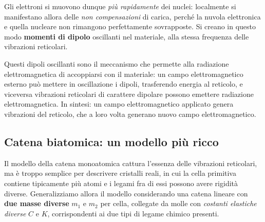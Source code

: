 Gli elettroni si muovono dunque \emph{più rapidamente} dei nuclei: localmente si manifestano allora delle \emph{non compensazioni} di carica, perché la nuvola elettronica e quella nucleare non rimangono perfettamente sovrapposte. Si creano in questo modo \textbf{momenti di dipolo} oscillanti nel materiale, alla stessa frequenza delle vibrazioni reticolari.

Questi dipoli oscillanti sono il meccanismo che permette alla radiazione elettromagnetica di accoppiarsi con il materiale: un campo elettromagnetico esterno può mettere in oscillazione i dipoli, trasferendo energia al reticolo, e viceversa vibrazioni reticolari di carattere dipolare possono emettere radiazione elettromagnetica. In sintesi: un campo elettromagnetico applicato genera vibrazioni del reticolo, che a loro volta generano nuovo campo elettromagnetico.

\subsection{Catena biatomica: un modello più ricco}

Il modello della catena monoatomica cattura l'essenza delle vibrazioni reticolari, ma è troppo semplice per descrivere cristalli reali, in cui la cella primitiva contiene tipicamente più atomi e i legami fra di essi possono avere rigidità diverse. Generalizziamo allora il modello considerando una catena lineare con \textbf{due masse diverse} \( m_1 \) e \( m_2 \) per cella, collegate da molle con \emph{costanti elastiche diverse} \( C \) e \( K \), corrispondenti ai due tipi di legame chimico presenti.

